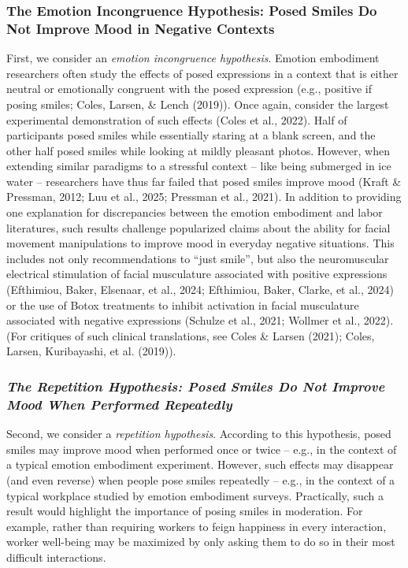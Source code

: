 \documentclass[
  letterpaper,
  DIV=11,
  numbers=noendperiod]{scrartcl}
\begin{document}
\subsubsection{The Emotion Incongruence Hypothesis: Posed Smiles Do Not
Improve Mood in Negative
Contexts}\label{the-emotion-incongruence-hypothesis-posed-smiles-do-not-improve-mood-in-negative-contexts}

First, we consider an \emph{emotion incongruence hypothesis}. Emotion
embodiment researchers often study the effects of posed expressions in a
context that is either neutral or emotionally congruent with the posed
expression (e.g., positive if posing smiles; Coles, Larsen, \& Lench
(2019)). Once again, consider the largest experimental demonstration of
such effects ({Coles et al.}, 2022). Half of participants posed smiles
while essentially staring at a blank screen, and the other half posed
smiles while looking at mildly pleasant photos. However, when extending
similar paradigms to a stressful context -- like being submerged in ice
water -- researchers have thus far failed that posed smiles improve mood
(Kraft \& Pressman, 2012; Luu et al., 2025; Pressman et al., 2021). In
addition to providing one explanation for discrepancies between the
emotion embodiment and labor literatures, such results challenge
popularized claims about the ability for facial movement manipulations
to improve mood in everyday negative situations. This includes not only
recommendations to ``just smile'', but also the neuromuscular electrical
stimulation of facial musculature associated with positive expressions
(Efthimiou, Baker, Elsenaar, et al., 2024; Efthimiou, Baker, Clarke, et
al., 2024) or the use of Botox treatments to inhibit activation in
facial musculature associated with negative expressions (Schulze et al.,
2021; Wollmer et al., 2022). (For critiques of such clinical
translations, see Coles \& Larsen (2021); Coles, Larsen, Kuribayashi, et
al. (2019)).

\subsubsection{\texorpdfstring{\textbf{\emph{The Repetition Hypothesis:
Posed Smiles Do Not Improve Mood When Performed
Repeatedly}}}{The Repetition Hypothesis: Posed Smiles Do Not Improve Mood When Performed Repeatedly}}\label{the-repetition-hypothesis-posed-smiles-do-not-improve-mood-when-performed-repeatedly}

Second, we consider a \emph{repetition hypothesis}. According to this
hypothesis, posed smiles may improve mood when performed once or twice
-- e.g., in the context of a typical emotion embodiment experiment.
However, such effects may disappear (and even reverse) when people pose
smiles repeatedly -- e.g., in the context of a typical workplace studied
by emotion embodiment surveys. Practically, such a result would
highlight the importance of posing smiles in moderation. For example,
rather than requiring workers to feign happiness in every interaction,
worker well-being may be maximized by only asking them to do so in their
most difficult interactions.
\end{document}
